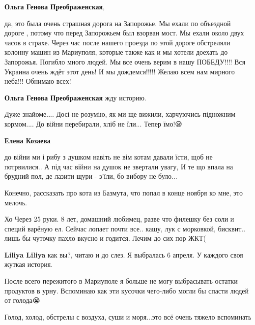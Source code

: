 \begin{itemize}
\textbf{Ольга Генова Преображенская}, 

да, это была очень страшная дорога на Запорожье. Мы ехали по объездной дороге ,
потому что перед Запорожьем был взорван мост. Мы ехали около двух часов в
страхе. Через час после нашего проезда по этой дороге обстреляли колонну машин
из Мариуполя, которые также как и мы хотели доехать до Запорожья. Погибло много
людей. Мы все очень верим в нашу ПОБЕДУ!!!! Вся Украина очень ждёт этот день! И
мы дождемся!!!!! Желаю всем нам мирного неба!!! Обнимаю всех!

\textbf{Ольга Генова Преображенская} жду историю. 💙💛

\end{itemize} %


Дуже знайоме.... Досі не розумію, як ми ще вижили, харчуючись підножним
кормом.... До війни перебирали, хліб не їли... Тепер їмо!😪

\begin{itemize} %
\textbf{Елена Козаева} 

до війни ми і рибу з душком навіть не вім котам давали їсти, щоб не потрвилися..
А під час війни на душок не звертали увагу, И те що впала на брудний пол, де
лазити щури - з'їли, бо вибору не було...


Конечно, рассказать про кота из Базмута, что попал в конце ноября ко мне, это
мелочь.

Хо Через 25 руки. 8 лет, домашний любимец, разве что филешку без соли и специй
варёную ел.  Сейчас лопает почти все.. кашу, лук с морковкой, бисквит.. лишь бы
чуточку пахло вкусно и годится.  Лечим до сих пор ЖКТ(

\textbf{Liliya Liliya} как вы?, читаю и до слез. Я выбралась 6 апреля. У каждого своя жуткая история.
\end{itemize} %


После всего пережитого в Мариуполе я больше не могу выбрасывать остатки
продуктов в урну. Вспоминаю как эти кусочки чего-либо могли бы спасти людей от
голода😭

Голод, холод, обстрелы с воздуха, суши и моря...это всё очень тяжело
вспоминать🥺

